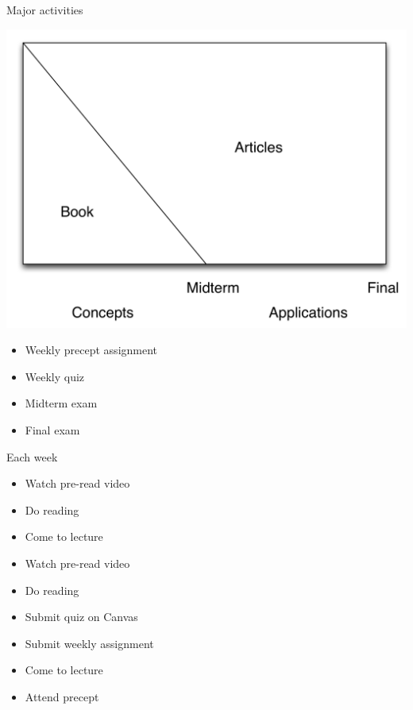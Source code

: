 \documentclass[aspectratio=169]{beamer}
\begin{document}
\begin{frame}

\begin{center}
\Large{Major activities}
\end{center}

\end{frame}
\begin{frame}

\begin{center}
\includegraphics[height=0.90\textheight]{figures/class_structure}
\end{center}


\end{frame}
\begin{frame}

\begin{itemize}
\item Weekly precept assignment
\item Weekly quiz
\item Midterm exam
\item Final exam
\end{itemize}

\end{frame}
\begin{frame}

Each week
\begin{itemize}
\item Watch pre-read video
\pause
\item Do reading
\pause
\item Come to lecture
\pause
\item Watch pre-read video
\item Do reading
\item Submit quiz on Canvas
\item Submit weekly assignment
\item Come to lecture
\pause
\item Attend precept
\end{itemize}

\end{frame}
\end{document}
